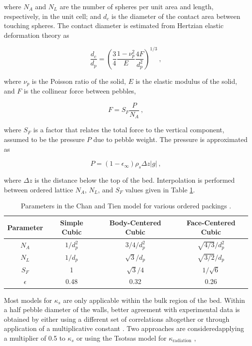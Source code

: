 \noindent where \(N_A\) and \(N_L\) are the number of spheres per unit area and length, respectively, in the unit cell; and \(d_c\) is the diameter of the contact area between touching spheres. The contact diameter is estimated from Hertzian elastic deformation theory as \cite{you}

\begin{equation}
\label{eq:ContactRadius}
\frac{d_c}{d_p}=\left(\frac{3}{4}\frac{1-\nu_p^2}{E}\frac{4F}{d_p^2}\right)^{1/3}\ ,
\end{equation}

\noindent where \(\nu_p\) is the Poisson ratio of the solid, \(E\) is the elastic modulus of the solid, and \(F\) is the collinear force between pebbles,

\begin{equation}
\label{eq:ContactForce}
F=S_F\frac{P}{N_A}\ ,
\end{equation}

\noindent where \(S_F\) is a factor that relates the total force to the vertical component, assumed to be the pressure \(P\) due to pebble weight. The pressure is approximated as

\begin{equation}
P=(1-\epsilon_\infty)\rho_s\Delta z|g|\ ,
\end{equation}

\noindent where \(\Delta z\) is the distance below the top of the bed. Interpolation is performed between ordered lattice \(N_A\), \(N_L\), and \(S_F\) values given in Table \ref{table:ChanTien}.

\begin{table}[!h]
\caption{Parameters in the Chan and Tien model for various ordered packings \cite{chan}.}
\centering
\begin{tabular}{c c c c}
\toprule
\textbf{Parameter} & \textbf{Simple Cubic} & \textbf{Body-Centered Cubic} & \textbf{Face-Centered Cubic}\\
\midrule
\(N_A\) & \(1/d_p^2\) & \(3/4/d_p^2\) & \(\sqrt{4/3}/d_p^2\)\\
\(N_L\) & \(1/d_p\) & \(\sqrt{3}/d_p\) & \(\sqrt{3/2}/d_p\)\\
\(S_F\) & 1 & \(\sqrt{3}/4\)& \(1/\sqrt{6}\)\\
\(\epsilon\) & 0.48 & 0.32 & 0.26\\
\bottomrule
\end{tabular}
\label{table:ChanTien}
\end{table} 

Most models for \(\kappa_s\) are only applicable within the bulk region of the bed. Within a half pebble diameter of the walls, better agreement with experimental data is obtained by either using a different set of correlations altogether \cite{auwerda_2011} or through application of a multiplicative constant \cite{tecdoc1163}. Two approaches are considered\mdash applying a multiplier of 0.5 to \(\kappa_s\) or using the Tsotsas model for \(\kappa_\text{radiation}\) \cite{visser}, 

